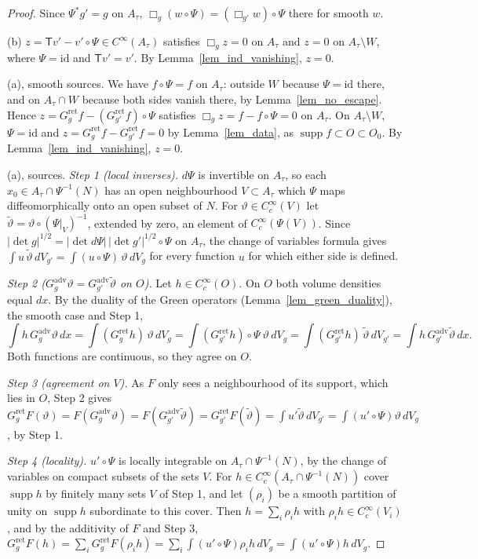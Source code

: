 \documentclass[11pt,a4paper,reqno]{amsart}
\theoremstyle{definition}
\numberwithin{equation}{section}
\newcommand{\sT}{\mathsf{T}}
\newcommand{\supp}{\operatorname{supp}}
\newcommand{\id}{\mathrm{id}}
\newcommand{\ret}{\mathrm{ret}}
\newcommand{\adv}{\mathrm{adv}}
\begin{document}
\begin{proof}
Since $\Psi^*g'=g$ on $A_\tau$, $\Box_g(w\circ\Psi)=(\Box_{g'}w)\circ\Psi$ there for smooth $w$.

(b) $z=\sT v'-v'\circ\Psi\in C^\infty(A_\tau)$ satisfies $\Box_gz=0$ on $A_\tau$ and $z=0$ on $A_\tau\setminus W$, where
$\Psi=\id$ and $\sT v'=v'$. By Lemma~\ref{lem_ind_vanishing}, $z=0$.

(a), smooth sources. We have $f\circ\Psi=f$ on $A_\tau$: outside $W$ because $\Psi=\id$ there, and on $A_\tau\cap W$
because both sides vanish there, by Lemma~\ref{lem_no_escape}. Hence $z=G^\ret_gf-(G^\ret_{g'}f)\circ\Psi$ satisfies
$\Box_gz=f-f\circ\Psi=0$ on $A_\tau$. On $A_\tau\setminus W$, $\Psi=\id$ and $z=G^\ret_gf-G^\ret_{g'}f=0$ by
Lemma~\ref{lem_data}, as $\supp f\subset O\subset O_0$. By Lemma~\ref{lem_ind_vanishing}, $z=0$.

(a), sources. \emph{Step 1 (local inverses).} $d\Psi$ is invertible on $A_\tau$, so each $x_0\in A_\tau\cap\Psi^{-1}(N)$
has an open neighbourhood $V\subset A_\tau$ which $\Psi$ maps diffeomorphically onto an open subset of $N$. For
$\vartheta\in C_c^\infty(V)$ let $\tilde\vartheta=\vartheta\circ(\Psi|_V)^{-1}$, extended by zero, an element of
$C_c^\infty(\Psi(V))$. Since $|\det g|^{1/2}=|\det d\Psi|\,|\det g'|^{1/2}\circ\Psi$ on $A_\tau$, the change of variables
formula gives $\int u\,\tilde\vartheta\,dV_{g'}=\int(u\circ\Psi)\,\vartheta\,dV_g$ for every function $u$ for which
either side is defined.

\emph{Step 2 ($G^\adv_g\vartheta=G^\adv_{g'}\tilde\vartheta$ on $O$).} Let $h\in C_c^\infty(O)$. On $O$ both volume
densities equal $dx$. By the duality of the Green operators (Lemma~\ref{lem_green_duality}), the smooth case and Step 1,
\[
\int h\,G^\adv_g\vartheta\,dx=\int(G^\ret_gh)\,\vartheta\,dV_g=\int(G^\ret_{g'}h)\circ\Psi\ \vartheta\,dV_g
=\int(G^\ret_{g'}h)\,\tilde\vartheta\,dV_{g'}=\int h\,G^\adv_{g'}\tilde\vartheta\,dx .
\]
Both functions are continuous, so they agree on $O$.

\emph{Step 3 (agreement on $V$).} As $F$ only sees a neighbourhood of its support, which lies in $O$, Step 2 gives
$G^\ret_gF(\vartheta)=F(G^\adv_g\vartheta)=F(G^\adv_{g'}\tilde\vartheta)=G^\ret_{g'}F(\tilde\vartheta)
=\int u'\tilde\vartheta\,dV_{g'}=\int(u'\circ\Psi)\vartheta\,dV_g$, by Step 1.

\emph{Step 4 (locality).} $u'\circ\Psi$ is locally integrable on $A_\tau\cap\Psi^{-1}(N)$, by the change of variables on
compact subsets of the sets $V$. For $h\in C_c^\infty(A_\tau\cap\Psi^{-1}(N))$ cover $\supp h$ by finitely many sets $V$ of
Step 1, and let $(\rho_i)$ be a smooth partition of unity on $\supp h$ subordinate to this cover. Then $h=\sum_i\rho_ih$
with $\rho_ih\in C_c^\infty(V_i)$, and by the additivity of $F$ and Step 3,
$G^\ret_gF(h)=\sum_iG^\ret_gF(\rho_ih)=\sum_i\int(u'\circ\Psi)\rho_ih\,dV_g=\int(u'\circ\Psi)h\,dV_g$.
\end{proof}
\end{document}
